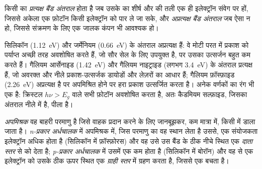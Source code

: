 \begin{definition}[प्रत्यक्ष और अप्रत्यक्ष अंतराल]\label{def:b3:solid-state:gap-types}
किसी  का \emph{प्रत्यक्ष बैंड अंतराल} होता है जब
उसके  का शीर्ष और  की तली एक ही
इलेक्ट्रॉन संवेग पर हों, जिससे अकेला एक फ़ोटॉन किसी इलेक्ट्रॉन को पार ले जा सके, और
\emph{अप्रत्यक्ष बैंड अंतराल} जब ऐसा न हो, जिससे
संक्रमण के लिए एक जालक कंपन भी आवश्यक हो।
\end{definition}

सिलिकॉन (\qty{1.12}{eV}) और जर्मेनियम (\qty{0.66}{eV}) के अंतराल अप्रत्यक्ष हैं:
वे मोटी परत में प्रकाश को पर्याप्त अच्छी तरह अवशोषित करते हैं, जो सौर सेल के लिए उपयुक्त है, पर
उसका उत्सर्जन बहुत कम करते हैं। गैलियम आर्सेनाइड (\qty{1.42}{eV}) और गैलियम नाइट्राइड (लगभग
\qty{3.4}{eV}) के अंतराल प्रत्यक्ष हैं, जो अवरक्त और नीले प्रकाश-उत्सर्जक
डायोडों और लेज़रों का आधार हैं; गैलियम फ़ॉस्फ़ाइड (\qty{2.26}{eV}) अप्रत्यक्ष है पर अपमिश्रित होने पर हरा
प्रकाश उत्सर्जित करता है। अनेक वर्णकों का रंग भी एक  है: क्रिस्टल
$h\nu > E_g$ वाले सभी फ़ोटॉन अवशोषित करता है, अतः कैडमियम सल्फ़ाइड, जिसका अंतराल नीले में है,
पीला है।

\begin{definition}[अपमिश्रण]\label{def:b3:solid-state:doping}
\emph{अपमिश्रक} वह बाहरी परमाणु है जिसे वाहक प्रदान करने के लिए
जानबूझकर, कम मात्रा में, किसी  में डाला जाता है। \emph{n-प्रकार
अर्धचालक} में अपमिश्रक में, जिस परमाणु का वह स्थान लेता है उससे, एक संयोजकता
इलेक्ट्रॉन अधिक होता है (सिलिकॉन में फ़ॉस्फ़ोरस) और वह उसे उस बैंड के ठीक नीचे स्थित
एक \emph{दाता स्तर} से  को देता है;
\emph{p-प्रकार अर्धचालक} में उसमें एक
कम होता है (सिलिकॉन में बोरॉन) और वह  से एक इलेक्ट्रॉन को उसके ठीक ऊपर स्थित
एक \emph{ग्राही स्तर} में ग्रहण करता है, जिससे एक  बचता है।
\end{definition}

